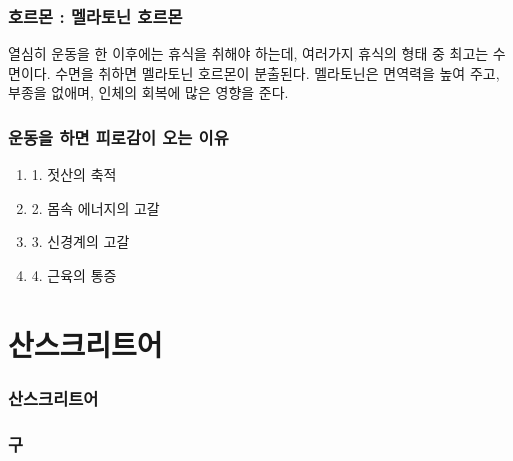 \documentclass[12pt, a4paper, oneside]{book}
\let\stdsection\section
\renewcommand\section{\newpage\stdsection}
\begin{document}
%
		\section{호르몬 : 멜라토닌 호르몬}


열심히 운동을 한 이후에는 휴식을 취해야 하는데, 여러가지 휴식의 형태 중 최고는 수면이다.
수면을 취하면 멜라토닌 호르몬이 분출된다.
멜라토닌은 면역력을 높여 주고, 부종을 없애며, 인체의 회복에 많은 영향을 준다.




%
		\section{운동을 하면 피로감이 오는 이유}


		\begin{enumerate}				[topsep=0.0em, 
									parsep=0.0em, 
									itemsep=0em, 
									leftmargin=6.0em, 
									labelwidth=3em, 
									labelsep=3em] 
			\item 	1. 젓산의 축적
			\item 	2. 몸속 에너지의 고갈
			\item 	3. 신경계의 고갈
			\item 	4. 근육의 통증
		\end{enumerate}




	\part{산스크리트어}
	\noptcrule
	\parttoc				

%
%
%
\newpage
\section{산스크리트어}



\newpage
\section{구}
\end{document}
